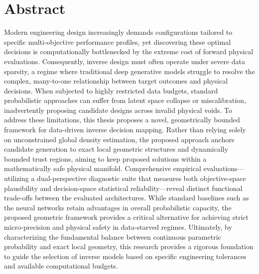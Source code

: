 
\chapter*{Abstract}

Modern engineering design increasingly demands configurations tailored to specific multi-objective performance profiles, yet discovering these optimal decisions is computationally bottlenecked by the extreme cost of forward physical evaluations. Consequently, inverse design must often operate under severe data sparsity, a regime where traditional deep generative models struggle to resolve the complex, many-to-one relationship between target outcomes and physical decisions. When subjected to highly restricted data budgets, standard probabilistic approaches can suffer from latent space collapse or miscalibration, inadvertently proposing candidate designs across invalid physical voids. To address these limitations, this thesis proposes a novel, geometrically bounded framework for data-driven inverse decision mapping. Rather than relying solely on unconstrained global density estimation, the proposed approach anchors candidate generation to exact local geometric structures and dynamically bounded trust regions, aiming to keep proposed solutions within a mathematically safe physical manifold. Comprehensive empirical evaluations—utilizing a dual-perspective diagnostic suite that measures both objective-space plausibility and decision-space statistical reliability—reveal distinct functional trade-offs between the evaluated architectures. While standard baselines such as the neural networks retain advantages in overall probabilistic capacity, the proposed geometric framework provides a critical alternative for achieving strict micro-precision and physical safety in data-starved regimes. Ultimately, by characterizing the fundamental balance between continuous parametric probability and exact local geometry, this research provides a rigorous foundation to guide the selection of inverse models based on specific engineering tolerances and available computational budgets.
